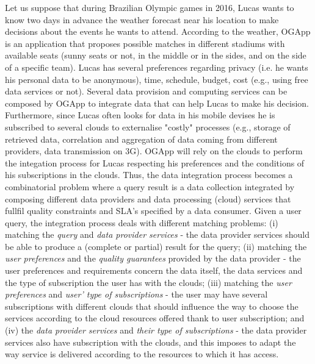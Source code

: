 Let us suppose that during Brazilian Olympic games in 2016, Lucas wants to know two days in advance the weather forecast near his  location to make decisions about the events he wants to attend. According to the weather, OGApp is an application that proposes possible matches  in different stadiums with available seats   (sunny seats or not, in the middle or in the sides, and on the side of a specific team).
%
 Lucas has several preferences regarding privacy  (i.e. he wants his personal data to be anonymous), time, schedule, budget, cost (e.g., using free data services or not). Several data provision and computing services  can be composed by OGApp to integrate data that can help Lucas to make his decision. Furthermore, since Lucas often looks for data in his mobile devises he is subscribed to several clouds to externalise "costly"  processes (e.g., storage of retrieved data, correlation and aggregation of data coming from different providers, data transmission on 3G). 
%
OGApp will rely on the clouds to perform the integation process for Lucas respecting his preferences and the conditions of his subscriptions in the clouds. 
%
Thus, the data integration process becomes a combinatorial problem where a query result is a data collection integrated  by composing different data providers and data processing (cloud) services that fullfil quality constraints and SLA's specified by a data consumer.
Given a user query, the integration process deals with different matching problems: 
(i) matching the \textit{query} and \textit{data provider services} - the data provider services should be able to produce a (complete or partial) result for the query; 
(ii) matching the \textit{user preferences} and the \textit{quality guarantees} provided by the data provider - the user preferences and requirements concern the data itself, the data services and the type of subscription the user has with the clouds; 
(iii) matching the \textit{user preferences} and \textit{user' type of subscriptions} - the user may have several subscriptions with different clouds that should influence the way to choose the services according to the cloud resources offered thank to user subscription; and 
(iv) the \textit{data provider services} and \textit{their type of subscriptions} - the data provider services also have  subscription with the clouds, and this imposes to adapt the way service is delivered according to the resources to which it has access.

